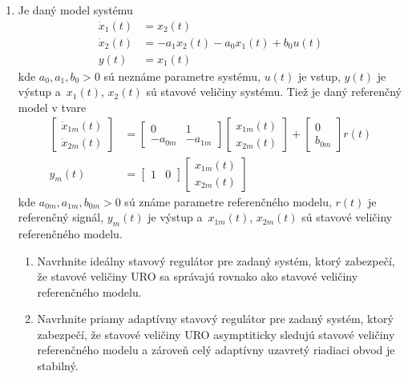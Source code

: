 \documentclass[a4paper, 10pt, ]{article}
\begin{document}
\begin{enumerate}[leftmargin=0pt, labelsep=4mm, itemsep=0pt]
		\item Je daný model systému
		\begin{align*}
			\dot{x}_1(t) &= x_2(t) \\
			\dot{x}_2(t) &= -a_1 x_2(t) - a_0 x_1(t) + b_0 u(t) \\
			y(t) & = x_1(t)
		\end{align*}
		kde $a_0, a_1, b_0 > 0$ sú neznáme parametre systému, $u(t)$ je vstup, $y(t)$ je výstup a~$x_1(t)$, $x_2(t)$ sú stavové veličiny systému. Tiež je daný referenčný model v tvare
		\begin{align*}
			\begin{bmatrix}
				\dot{x}_{1m}(t) \\ \dot{x}_{2m}(t)
			\end{bmatrix}
			&=
			\begin{bmatrix}
				 0 & 1 \\ -a_{0m} & -a_{1m}
			\end{bmatrix}
			\begin{bmatrix}
				 x_{1m}(t)  \\ x_{2m}(t)
			\end{bmatrix}
			+
			\begin{bmatrix}
				 0  \\  b_{0m}
			\end{bmatrix}
			r(t) \\
			y_m(t)
			&=
			\begin{bmatrix}
				 1 & 0
			\end{bmatrix}
			\begin{bmatrix}
				 x_{1m}(t)  \\ x_{2m}(t)
			\end{bmatrix}
		\end{align*}
		kde $a_{0m}, a_{1m}, b_{0m} > 0$ sú známe parametre referenčného modelu, $r(t)$ je referenčný signál, $y_m(t)$ je výstup a~$x_{1m}(t)$, $x_{2m}(t)$ sú stavové veličiny referenčného modelu.


    \begin{enumerate}
    	\item Navrhnite ideálny stavový regulátor pre zadaný systém, ktorý zabezpečí, že stavové veličiny URO sa správajú rovnako ako stavové veličiny referenčného modelu.
    	\item Navrhnite priamy adaptívny stavový regulátor pre zadaný systém, ktorý zabezpečí, že stavové veličiny URO asymptiticky sledujú stavové veličiny referenčného modelu a zároveň celý adaptívny uzavretý riadiaci obvod je stabilný.
    \end{enumerate}







\end{enumerate}
\end{document}
